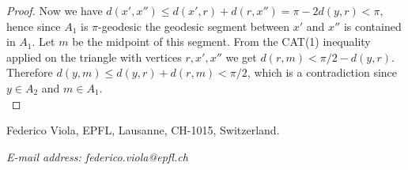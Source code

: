 \documentclass{article}
\theoremstyle{definition}
\theoremstyle{remark}
\theoremstyle{plain}
\begin{document}
\begin{proof}
    Now we have $d(x',x'')\leq d(x',r)+d(r,x'')=\pi-2d(y,r)<\pi$, hence since $A_1$ is $\pi$-geodesic the geodesic segment between $x'$ and $x''$ is contained in $A_1$. Let $m$ be the midpoint of this segment. From the CAT(1) inequality applied on the triangle with vertices $r,x',x''$ we get $d(r,m)<\pi/2-d(y,r)$. Therefore $d(y,m)\leq d(y,r)+d(r,m)<\pi/2$, which is a contradiction since $y\in A_2$ and $m\in A_1$. \\
\end{proof}

\printbibliography

Federico Viola, EPFL, Lausanne, CH-1015, Switzerland.

\textit{E-mail address: federico.viola@epfl.ch}
\end{document}
